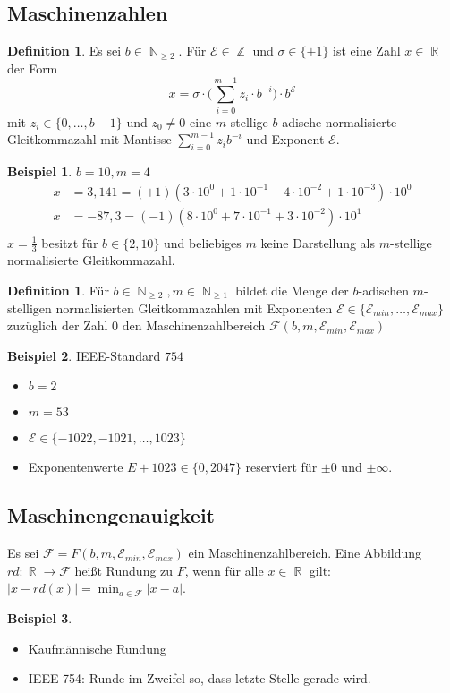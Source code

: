 \documentclass[a4paper,12pt]{article}
\DeclareMathOperator{\N}{\mathbb N}
\DeclareMathOperator{\R}{\mathbb R}
\DeclareMathOperator{\Z}{\mathbb Z}
\theoremstyle{definition}
\newtheorem*{example}{Beispiel}
\newtheorem{definition}[axiom]{Definition}
\begin{document}
	\setcounter{section}{4}
	\setcounter{subsection}{3}
	\subsection{Maschinenzahlen}
	\begin{definition}
		Es sei $b \in \N_{\geq 2}$. Für $\mathcal{E} \in \Z$ und $\sigma \in \{\pm 1\}$ ist eine Zahl $x \in \R$ der Form
		\[
			x = \sigma \cdot \Big(\sum_{i = 0}^{m - 1} z_i \cdot b^{-i}\Big) \cdot b^{\mathcal{E}}
		\]
		mit $z_i \in \{0,\ldots, b-1\}$ und $z_0 \neq 0$ eine $m$-stellige $b$-adische normalisierte Gleitkommazahl mit Mantisse $\sum_{i = 0}^{m-1} z_i b^{-i}$ und Exponent $\mathcal{E}$.
	\end{definition}
	\begin{example}
		$b = 10, m = 4$
		\begin{align*}
			x &= 3,141 = (+1)(3 \cdot 10^0 + 1 \cdot 10^{-1} + 4\cdot 10^{-2} + 1 \cdot 10^{-3}) \cdot 10^0\\
			x &= -87,3 = (-1)(8 \cdot 10^0 + 7 \cdot 10^{-1} + 3\cdot 10^{-2}) \cdot 10^1\\
		\end{align*}
		$x = \frac{1}{3}$ besitzt für $b \in \{2,10\}$ und beliebiges $m$ keine Darstellung als $m$-stellige normalisierte Gleitkommazahl.
	\end{example}
	\begin{definition}
		Für $b \in \N_{\geq 2}, m \in \N_{\geq 1}$ bildet die Menge der $b$-adischen $m$-stelligen normalisierten Gleitkommazahlen mit Exponenten $\mathcal{E} \in \{\mathcal{E}_{min}, \ldots, \mathcal{E}_{max}\}$ zuzüglich der Zahl $0$ den Maschinenzahlbereich $\mathcal{F}(b,m,\mathcal{E}_{min}, \mathcal{E}_{max})$
	\end{definition}
	\begin{example}
		IEEE-Standard $754$
		\begin{itemize}
			\item $b = 2$
			\item $m = 53$
			\item $\mathcal{E} \in \{-1022, -1021, \ldots, 1023\}$
			\item Exponentenwerte $E + 1023 \in \{0, 2047\}$ reserviert für $\pm 0$ und $\pm \infty$.
		\end{itemize}
	\end{example}
	\subsection{Maschinengenauigkeit}
	Es sei $\mathcal{F} = F(b,m, \mathcal{E}_{min}, \mathcal{E}_{max})$ ein Maschinenzahlbereich. Eine Abbildung $rd: \R \to \mathcal{F}$ heißt Rundung zu $F$, wenn für alle $x \in \R$ gilt: $\lvert x - rd(x)\rvert = \min_{a \in \mathcal{F}}\lvert x - a\rvert$.
	\begin{example}
		\begin{itemize}
			\item Kaufmännische Rundung
			\item IEEE 754: Runde im Zweifel so, dass letzte Stelle gerade wird.
		\end{itemize}
	\end{example}
	
\end{document}
